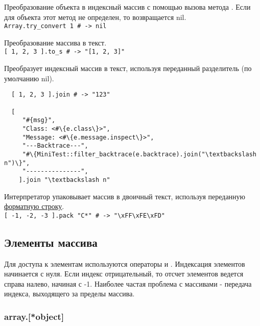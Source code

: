 \begin{methodlist}
  Преобразование объекта в индексный массив с помощью вызова метода . Если для объекта этот метод не определен, то возвращается nil. 
  \\\verb!Array.try_convert 1 # -> nil!

  Преобразование массива в текст. 
  \\\verb![ 1, 2, 3 ].to_s # -> "[1, 2, 3]"!


  Преобразует индексный массив в текст, используя переданный разделитель (по умолчанию nil).
  \begin{verbatim}
  [ 1, 2, 3 ].join # -> "123"

  [
     "#{msg}",
     "Class: <#\{e.class\}>",
     "Message: <#\{e.message.inspect\}>",
     "---Backtrace---",
     "#\{MiniTest::filter_backtrace(e.backtrace).join("\textbackslash n")\}",
     "---------------",
    ].join "\textbackslash n"
  \end{verbatim}  

  Интерпретатор упаковывает массив в двоичный текст, используя переданную \hyperlink{apppack}{\underline{форматную строку}}.
  \\\verb![ -1, -2, -3 ].pack "C*" # -> "\xFF\xFE\xFD"!
\end{methodlist}

\subsection*{Элементы массива}

Для доступа к элементам используются операторы \method{[]} и \method{[]=}. Индексация элементов начинается с нуля. Если индекс отрицательный, то отсчет элементов ведется справа налево, начиная с -1. Наиболее частая проблема с массивами - передача индекса, выходящего за пределы массива.

\subsubsection*{array.[*object]} 


